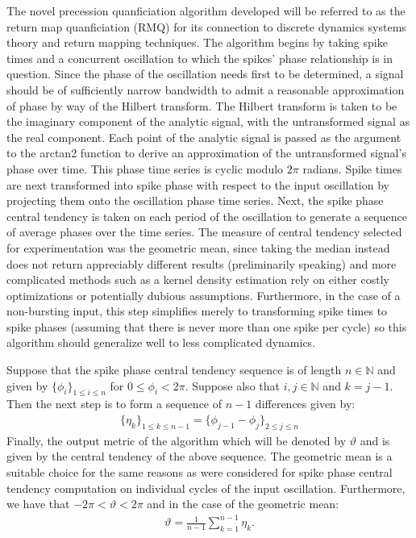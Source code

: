 \documentclass[12pt, letterpaper]{article}
\newenvironment{collapsable}{}{}
\begin{document}
\begin{collapsable}
  The novel precession quanficiation algorithm developed will be referred to as
  the return map quanficiation (RMQ) for its connection to discrete dynamics
  systems theory and return mapping techniques. The algorithm begins by taking
  spike times and a concurrent oscillation to which the spikes' phase relationship
  is in question. Since the phase of the oscillation needs first to be determined,
  a signal should be of sufficiently narrow bandwidth to admit a reasonable
  approximation of phase by way of the Hilbert transform. The Hilbert transform
  is taken to be the imaginary component of the analytic signal, with the
  untransformed signal as the real component. Each point of the analytic signal
  is passed as the argument to the arctan2 function to derive an approximation
  of the untransformed signal's phase over time. This phase time series
  is cyclic modulo $2\pi$ radians. Spike times are next transformed into spike
  phase with respect to the input oscillation by projecting them onto the oscillation phase
  time series. Next, the spike phase central tendency is taken on each period of
  the oscillation to generate a sequence of average phases over the time series. The measure of
  central tendency selected for experimentation was the geometric mean, since
  taking the median instead does not return appreciably different results
  (preliminarily speaking) and more complicated methods such as a kernel density
  estimation rely on either costly optimizations or potentially dubious
  assumptions. Furthermore, in the case of a non-bursting input, this step
  simplifies merely to transforming spike times to spike phases (assuming that
  there is never more than one spike per cycle) so this algorithm should
  generalize well to less complicated dynamics.

  \vspace{12pt}

  Suppose that the spike phase central tendency sequence is of length
  $n\in\mathbb{N}$ and given by $\{\phi_i\}_{1\leq i\leq n}$ for $0\leq \phi_i <
  2\pi$. Suppose also that $i,j\in\mathbb{N}$ and $k=j-1$. Then the next step
  is to form a sequence of $n-1$ differences given by:
  \begin{align*}
    \{\eta_k\}_{1\leq k\leq n-1}=\{\phi_{j-1}-\phi_j\}_{2\leq j\leq n}\tag{8}
  \end{align*}
  Finally, the output metric of the algorithm which will be denoted by $\vartheta$
  and is given by the central tendency of the above sequence. The geometric mean is a
  suitable choice for the same reasons as were considered for spike phase central
  tendency computation on individual cycles of the input oscillation. Furthermore,
  we have that $-2\pi<\vartheta<2\pi$ and in the case of the geometric mean:
  \begin{align*}
    \vartheta = \frac{1}{n-1}\sum_{k=1}^{n-1}\eta_k.\tag{9}
  \end{align*}


\end{collapsable}
\end{document}

